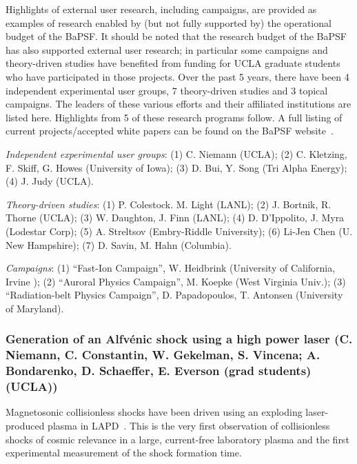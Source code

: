 \documentclass[11pt]{article}
\renewcommand{\cite}{\citep}
\begin{document}
Highlights of external user research, including campaigns, are
provided as examples of research enabled by (but not fully supported
by) the operational budget of the BaPSF.  It should be noted that the
research budget of the BaPSF has also supported external user
research; in particular some campaigns and theory-driven studies have
benefited from funding for UCLA graduate students who have
participated in those projects.  
Over the past 5 years, there have been 4 independent experimental
user groups, 7 theory-driven studies and 3 topical
campaigns. The leaders of these various efforts and their affiliated
institutions are listed here.  Highlights from 5 of these research
programs follow.  A full listing of current projects/accepted white
papers can be found on the BaPSF website~\cite{bapsfweb}.

\begin{description}
\item{\emph{Independent experimental user groups}}: (1) C. Niemann
  (UCLA); (2) C. Kletzing, F. Skiff, G. Howes (University of Iowa);  (3) D. Bui, Y. Song (Tri
  Alpha Energy); (4) J. Judy (UCLA).

\item{\emph{Theory-driven studies}}: (1) P. Colestock. M. Light (LANL);
(2) J. Bortnik, R. Thorne (UCLA); (3) W. Daughton, J. Finn (LANL); (4) D. D'Ippolito, J. Myra (Lodestar Corp); (5)
A. Streltsov (Embry-Riddle University); (6) Li-Jen Chen (U. New
Hampshire); (7) D. Savin, M. Hahn (Columbia).

\item{\emph{Campaigns}}: (1) ``Fast-Ion Campaign'', W. Heidbrink
(University of California, Irvine ); (2) ``Auroral Physics Campaign'', M. Koepke (West Virginia Univ.); (3)
``Radiation-belt Physics Campaign'', D. Papadopoulos, T. Antonsen (University of Maryland).
\end{description}



\subsubsection{Generation of an Alfv\'{e}nic shock
using a high power laser  (C. Niemann, C. Constantin, W. Gekelman,
S. Vincena; A. Bondarenko, D. Schaeffer, E. Everson (grad students) (UCLA))}

Magnetosonic collisionless shocks have been driven using an exploding
laser-produced plasma in LAPD~\citep{schaeffer:2014,niemann:2014}. This is the very first
observation of collisionless shocks of cosmic relevance in a large,
current-free laboratory plasma and the first experimental measurement
of the shock formation time. 
\end{document}
